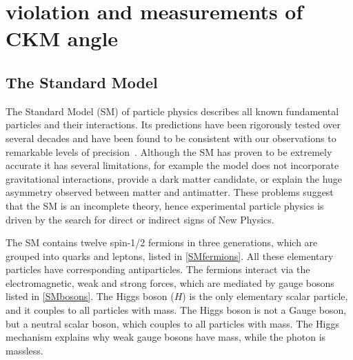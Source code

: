 %

\chapter{\label{ch:2-background}\CP violation and measurements of CKM angle \Pgamma} 


\section{The Standard Model}

The Standard Model (SM) of particle physics describes all known fundamental particles and their interactions. Its predictions have been rigorously tested over several decades and have been found to be consistent with our observations to remarkable levels of precision~\cite{SMprecision}. Although the SM has proven to be extremely accurate it has several limitations, for example the model does not incorporate gravitational interactions, provide a dark matter candidate, or explain the huge asymmetry observed between matter and antimatter. These problems suggest that the SM is an incomplete theory, hence experimental particle physics is driven by the search for direct or indirect signs of New Physics.

The SM contains twelve spin-1/2 fermions in three generations, which are grouped into quarks and leptons, listed in \tab\ref{SMfermions}. All these elementary particles have corresponding antiparticles. The fermions interact via the electromagnetic, weak and strong forces, which are mediated by gauge bosons listed in \tab\ref{SMbosons}. The Higgs boson ($H$) is the only elementary scalar particle, and it couples to all particles with mass. The Higgs boson is not a Gauge boson, but a neutral scalar boson, which couples to all particles with mass. The Higgs mechanism explains why weak gauge bosons have mass, while the photon is massless. 

